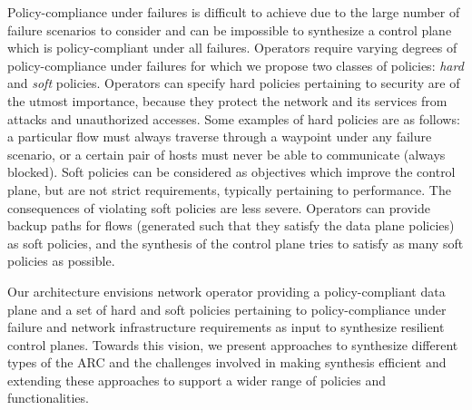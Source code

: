 Policy-compliance under failures is difficult to achieve due 
to the large number of failure scenarios to consider and can 
be impossible to synthesize a control plane which is 
policy-compliant under all failures. Operators require 
varying degrees of policy-compliance under failures for 
which we propose two classes of policies: {\em hard} and
{\em soft} policies. Operators can specify 
hard policies pertaining
to security are of the utmost importance, 
because they protect the network and
its services from attacks and unauthorized accesses. Some 
examples of hard policies are as follows: 
a particular flow must always traverse through a waypoint 
under any failure scenario, or a certain pair of hosts must 
never be able to communicate (always blocked). 
Soft policies can be considered as objectives which improve 
the control plane, but are not strict requirements, typically
pertaining to performance. The consequences of violating
soft policies are less severe. Operators can provide 
backup paths for flows (generated such that they 
satisfy the data plane policies) as soft policies, 
and the synthesis of the control plane 
tries to satisfy as many soft policies as 
possible. 



Our architecture envisions network operator providing
a policy-compliant data plane and a set of hard and soft policies
pertaining to policy-compliance under failure and network 
infrastructure requirements as input to synthesize resilient 
control planes. Towards this vision, we present  
approaches to synthesize different types of the ARC and the 
challenges involved in making synthesis efficient and
extending these approaches to support a wider range of 
policies and functionalities. 
